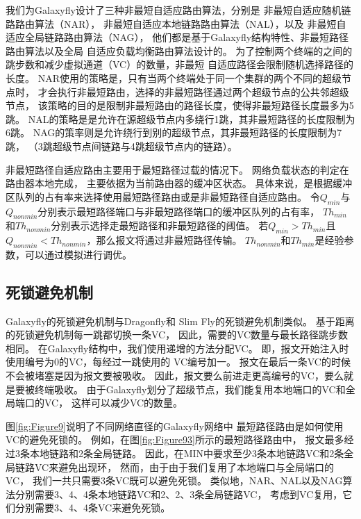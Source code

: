 我们为Galaxyfly设计了三种非最短自适应路由算法，分别是
非最短自适应随机链路路由算法（NAR），
非最短自适应本地链路路由算法（NAL），以及
非最短自适应全局链路路由算法（NAG），
他们都是基于Galaxyfly结构特性、非最短路径路由算法以及全局
自适应负载均衡路由算法设计的。
为了控制两个终端的之间的跳步数和减少虚拟通道（VC）的数量，非最短
自适应路径会限制随机选择路径的长度。
NAR使用的策略是，只有当两个终端处于同一个集群的两个不同的超级节点时，
才会执行非最短路由，选择的非最短路径通过两个超级节点的公共邻超级节点，
该策略的目的是限制非最短路由的路径长度，使得非最短路径长度最多为5跳。
NAL的策略是是允许在源超级节点内多绕行1跳，其非最短路径的长度限制为6跳。
NAG的策率则是允许绕行到别的超级节点，其非最短路径的长度限制为7跳，
（3跳超级节点间链路与4跳超级节点内的链路）。

非最短路径自适应路由主要用于最短路径过载的情况下。
网络负载状态的判定在路由器本地完成，
主要依据为当前路由器的缓冲区状态。
具体来说，是根据缓冲区队列的占有率来选择使用最短路径路由或是非最短路径自适应路由。
令$Q_{min}$与$Q_{nonmin}$分别表示最短路径端口与非最短路径端口的缓冲区队列的占有率，
$Th_{min}$和$Th_{nonmin}$分别表示选择走最短路径和非最短路径的阈值。
若$Q_{min}>Th_{min}$且$Q_{nonmin}<Th_{nonmin}$，那么报文将通过非最短路径传输。
$Th_{nonmin}$和$Th_{min}$是经验参数，可以通过模拟进行调优。

\subsection{死锁避免机制}

Galaxyfly的死锁避免机制与Dragonfly和
Slim Fly的死锁避免机制类似。
基于距离的死锁避免机制每一跳都切换一条VC，
因此，需要的VC数量与最长路径跳步数相同。
在Galaxyfly结构中，我们使用递增的方法分配VC。
即，报文开始注入时使用编号为0的VC，每经过一跳使用的
VC编号加一。
报文在最后一条VC的时候不会被堵塞是因为报文要被吸收。
因此，报文要么前进走更高编号的VC，要么就是要被终端吸收。
由于Galaxyfly划分了超级节点，我们能复用本地端口的VC和全局端口的VC，
这样可以减少VC的数量。

图\ref{fig:Figure9}说明了不同网络直径的Galaxyfly网络中
最短路径路由是如何使用VC的避免死锁的。
例如，在图\ref{fig:Figure93}所示的最短路径路由中，
报文最多经过3条本地链路和2条全局链路。
因此，在MIN中要求至少3条本地链路VC和2条全局链路VC来避免出现环，
然而，由于由于我们复用了本地端口与全局端口的VC，
我们一共只需要3条VC既可以避免死锁。
类似地，NAR、NAL以及NAG算法分别需要3、4、4条本地链路VC和2、2、3条全局链路VC，
考虑到VC复用，它们分别需要3、4、4条VC来避免死锁。

